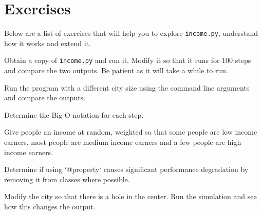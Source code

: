 \section{Exercises}

\par
Below are a list of exercises that will help you to explore \texttt{income.py},  understand how it works and extend it.

\begin{excercise}
Obtain a copy of \texttt{income.py} and run it. Modify it so that it runs for 100 steps and compare the two outputs. Be patient as it will take a while to run.
\end{excercise}

\begin{excercise}
Run the program with a different city size using the command line arguments and compare the outputs.
\end{excercise}

\begin{excercise}
Determine the Big-O notation for each step.
\end{excercise}

\begin{excercise}
Give people an income at random, weighted so that some people are low income earners, most people are medium income earners and a few people are high income earners.
\end{excercise}

\begin{excercise}
Determine if using `@property` causes significant performance degradation by removing it from classes where possible.
\end{excercise}

\begin{excercise}
Modify the city so that there is a hole in the center. Run the simulation and see how this changes the output.
\end{excercise}
